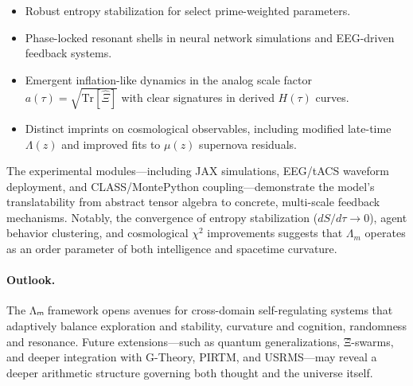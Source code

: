 \documentclass[12pt]{article}
\theoremstyle{plain}
\begin{document}
\begin{itemize}
  \item Robust entropy stabilization for select prime-weighted parameters.
  \item Phase-locked resonant shells in neural network simulations and EEG-driven feedback systems.
  \item Emergent inflation-like dynamics in the analog scale factor $a(\tau) = \sqrt{\text{Tr}[\hat{\Xi}]}$ with clear signatures in derived $H(\tau)$ curves.
  \item Distinct imprints on cosmological observables, including modified late-time $\Lambda(z)$ and improved fits to $\mu(z)$ supernova residuals.
\end{itemize}

The experimental modules—including JAX simulations, EEG/tACS waveform deployment, and CLASS/MontePython coupling—demonstrate the model’s translatability from abstract tensor algebra to concrete, multi-scale feedback mechanisms. Notably, the convergence of entropy stabilization ($dS/d\tau \to 0$), agent behavior clustering, and cosmological $\chi^2$ improvements suggests that $\Lambda_m$ operates as an order parameter of both intelligence and spacetime curvature.

\paragraph{Outlook.}  
The Λₘ framework opens avenues for cross-domain self-regulating systems that adaptively balance exploration and stability, curvature and cognition, randomness and resonance. Future extensions—such as quantum generalizations, Ξ̂-swarms, and deeper integration with G-Theory, PIRTM, and USRMS—may reveal a deeper arithmetic structure governing both thought and the universe itself.

\nocite{*}


\end{document}
